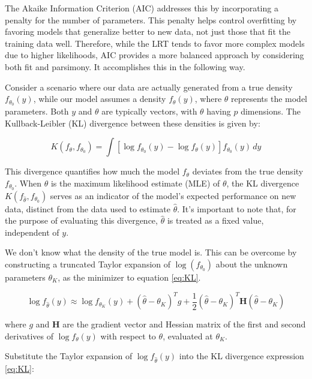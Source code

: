 \documentclass[
11pt, %
oneside, %
english, %
singlespacing, %
]{macthesis} %
\begin{document}
The Akaike Information Criterion (AIC) addresses this by incorporating a penalty for the number of parameters. This penalty helps control overfitting by favoring models that generalize better to new data, not just those that fit the training data well. Therefore, while the LRT tends to favor more complex models due to higher likelihoods, AIC provides a more balanced approach by considering both fit and parsimony. It accomplishes this in the following way.

Consider a scenario where our data are actually generated from a true density \(f_{\theta_0}(y)\), while our model assumes a density \(f_\theta(y)\), where \(\theta\) represents the model parameters. Both \(y\) and \(\theta\) are typically vectors, with \(\theta\) having \(p\) dimensions. The Kullback-Leibler (KL) divergence between these densities is given by:

\begin{equation}
K(f_\theta, f_{\theta_0}) = \int [\log{f_{\theta_0}(y)} - \log{f_\theta(y)}] f_{\theta_0}(y) \, dy 
\label{eq:KL}
\end{equation}

This divergence quantifies how much the model \(f_\theta\) deviates from the true density \(f_{\theta_0}\). When \(\hat{\theta}\) is the maximum likelihood estimate (MLE) of \(\theta\), the KL divergence \(K(f_{\hat{\theta}}, f_{\theta_0})\) serves as an indicator of the model's expected performance on new data, distinct from the data used to estimate \(\hat{\theta}\). It's important to note that, for the purpose of evaluating this divergence, \(\hat{\theta}\) is treated as a fixed value, independent of \(y\).

We don't know what the density of the true model is. This can be overcome by constructing a truncated Taylor expansion of \(\log(f_{\theta_0})\) about the unknown parameters \(\theta_K\), as the minimizer to equation \ref{eq:KL}.

\begin{equation}
\log{f_{\hat{\theta}}(y)} \approx \log{f_{\theta_K}(y)} + (\hat{\theta} - \theta_K)^T g + \frac{1}{2} (\hat{\theta} - \theta_K)^T \mathbf{H} (\hat{\theta} - \theta_K) 
\end{equation}
\label{eq:taylor}

where \(g\) and \(\mathbf{H}\) are the gradient vector and Hessian matrix of the first and second derivatives of \(\log f_\theta(y)\) with respect to \(\theta\), evaluated at \(\theta_K\).

Substitute the Taylor expansion of \(\log{f_{\hat{\theta}}(y)}\) into the KL divergence expression \ref{eq:KL}:
\end{document}
